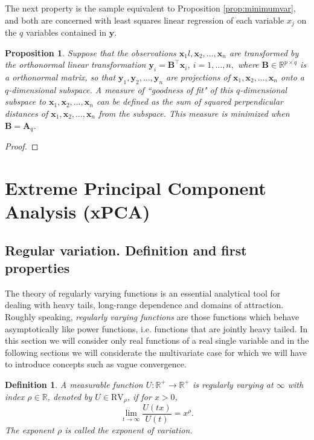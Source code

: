 \documentclass[11pt, oneside]{book}
\theoremstyle{plain}
\newtheorem{prop}{Proposition}[section]
\newtheorem{defn}{Definition}[section]
\theoremstyle{remark}
\newcommand*{\mbf}[1]{\mathbf{#1}}
\begin{document}
The next property is the sample equivalent to Proposition \ref{prop:minimumvar},
and both are concerned with least squares linear regression of each variable
$x_j$ on the $q$ variables contained in $\mbf{y}$.
\begin{prop}\label{prop:min-squaredistance}
    Suppose that the observations $\mbf{x}_1l, \mbf{x}_2, \dots, \mbf{x}_n$ are
    transformed by the orthonormal linear transformation $\mbf{y}_i =
    \mbf{B}^\top\mbf{x}_i$, $i=1,\dots,n,$ where $\mbf{B}\in\mathbb{R}^{p\times
    q}$ is a orthonormal matrix, so that $\mbf{y}_1, \mbf{y}_2, \dots,
    \mbf{y}_n$ are projections of $\mbf{x}_1, \mbf{x}_2, \dots, \mbf{x}_n$ onto
    a $q$-dimensional subspace. A measure of ``goodness of fit" of this
    $q$-dimensional subspace to $\mbf{x}_1, \mbf{x}_2, \dots, \mbf{x}_n$ can be
    defined as the sum of squared perpendicular distances of $\mbf{x}_1,
    \mbf{x}_2, \dots, \mbf{x}_n$ from the subspace. This measure is minimized
    when $\mbf{B} = \mbf{A}_q$.
\end{prop}    
\begin{proof}
\end{proof}    

\section{Extreme Principal Component Analysis (xPCA)}
\subsection{Regular variation. Definition and first properties}
The theory of regularly varying functions is an essential analytical tool for
dealing with heavy tails, long-range dependence and domains of attraction.
Roughly speaking, \emph{regularly varying functions} are those functions which
behave asymptotically like power functions, i.e. functions that are jointly
heavy tailed. In this section we will consider only real functions of a real
single variable and in the following sections we will considerate the
multivariate case for which we will have to introduce concepts such as vague
convergence. 

\begin{defn}
    A measurable function $U:\mathbb{R}^+\to\mathbb{R}^+$ is regularly varying
    at $\infty$ with index $\rho\in\mathbb{R}$, denoted by $U\in\text{RV}_\rho$,
    if for $x>0$, $$\lim_{t\to\infty}\frac{U(tx)}{U(t)} = x^\rho.$$ The exponent
    $\rho$ is called the exponent of variation.
\end{defn}    
\end{document}
